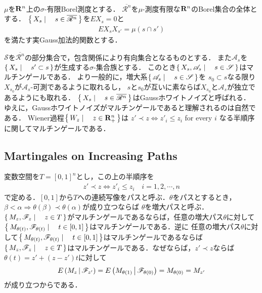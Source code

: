 	$\mu$を$\mathbf{R}^{n}$上の$\sigma$-有限Borel測度とする．
	$\overline{\mathscr{R}^{n}}$を$\mu$-測度有限な$\mathbf{R}^{n}$のBorel集合の全体とする．
	$\left\{\, X_{s} \mid \quad s \in \overline{\mathscr{R}^{n}}\, \right\}$を$EX_{s} = 0$と
	\begin{align}
		EX_{s}X_{s'} = \mu(s \cap s')
	\end{align}
	を満たす実Gauss加法的関数とする．
	
	$\mathscr{S}$を$\overline{\mathscr{R}^{n}}$の部分集合で，包含関係により有向集合となるものとする．
	また$\mathscr{A}_{s}$を$\left\{\, X_{s} \mid \quad s' \subset s\, \right\}$が生成する$\sigma$-集合族とする．
	このとき$\left\{\, X_{s},\mathscr{A}_{s} \mid \quad s \in \mathscr{S}\, \right\}$はマルチンゲールである．
	より一般的に，増大系$\left\{\, \mathscr{A}_{s} \mid \quad s \in \mathscr{S}\, \right\}$を
	$s_{0} \subset s$なる限り$X_{s_{0}}$が$\mathscr{A}_{s}$-可測であるように取れるし，
	$s$と$s_{0}$が互いに素ならば$X_{s_{0}}$と$\mathscr{A}_{s}$が独立であるようにも取れる．
	$\left\{\, X_{s} \mid \quad s \in \overline{\mathscr{R}^{n}}\, \right\}$はGaussホワイトノイズと呼ばれる．
	ゆえに，Gaussホワイトノイズがマルチンゲールであると理解されるのは自然である．
	Wiener過程$\left\{\, W_{z} \mid \quad z \in \mathbf{R}^{n}_{+}\, \right\}$は
	$z' \prec z \Longleftrightarrow z'_{i} \leq z_{i}$ for every $i$ なる半順序に関してマルチンゲールである．
	
\subsection{Martingales on Increasing Paths}
	変数空間を$T = [0,1]^{n}$とし，この上の半順序を
	\begin{align}
		z' \prec z \Longleftrightarrow z'_{i} \leq z_{i} \quad i=1,2,\cdots,n
	\end{align}
	で定める．$[0,1]$から$T$への連続写像をパスと呼ぶ．$\theta$をパスとするとき，
	$\beta < \alpha \Longrightarrow \theta(\beta) \prec \theta(\alpha)$が成り立つならば
	$\theta$を増大パスと呼ぶ．$\left\{\, M_{z},\mathscr{F}_{z} \mid \quad z \in T\, \right\}$がマルチンゲールであるならば，任意の増大パス$\theta$に対して
	$\left\{\, M_{\theta(t)},\mathscr{F}_{\theta(t)} \mid \quad t \in [0,1]\, \right\}$はマルチンゲールである．逆に
	任意の増大パス$\theta$に対して$\left\{\, M_{\theta(t)},\mathscr{F}_{\theta(t)} \mid \quad t \in [0,1]\, \right\}$はマルチンゲールであるならば
	$\left\{\, M_{z},\mathscr{F}_{z} \mid \quad z \in T\, \right\}$はマルチンゲールである．なぜならば，$z' \prec z$ならば
	$\theta(t) = z' + (z-z')t$に対して
	\begin{align}
		E\left( M_{z} \, \middle|\, \mathscr{F}_{z'} \right)
		= E\left( M_{\theta(1)} \, \middle|\, \mathscr{F}_{\theta(0)} \right)
		= M_{\theta(0)}
		= M_{z'}
	\end{align}
	が成り立つからである．